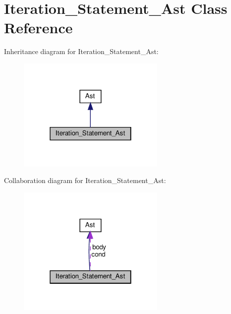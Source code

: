 \hypertarget{classIteration__Statement__Ast}{}\section{Iteration\+\_\+\+Statement\+\_\+\+Ast Class Reference}
\label{classIteration__Statement__Ast}


Inheritance diagram for Iteration\+\_\+\+Statement\+\_\+\+Ast\+:
\nopagebreak
\begin{figure}[H]
\begin{center}
\leavevmode
\includegraphics[width=202pt]{classIteration__Statement__Ast__inherit__graph}
\end{center}
\end{figure}


Collaboration diagram for Iteration\+\_\+\+Statement\+\_\+\+Ast\+:
\nopagebreak
\begin{figure}[H]
\begin{center}
\leavevmode
\includegraphics[width=202pt]{classIteration__Statement__Ast__coll__graph}
\end{center}
\end{figure}
